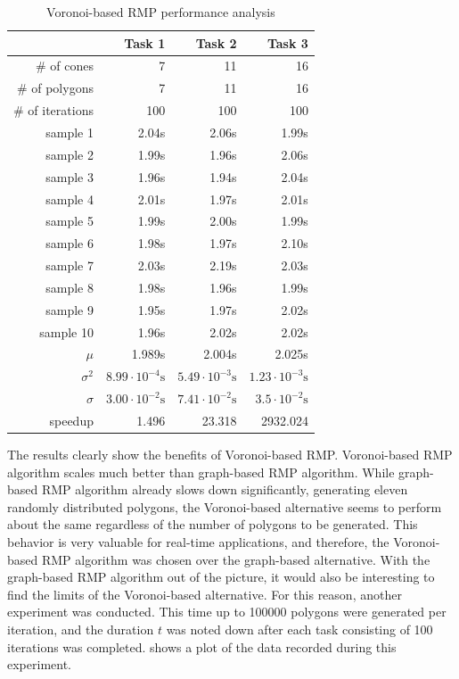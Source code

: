 \documentclass[11pt,a4paper,twoside,openright]{report}
\begin{document}
\begin{table}[h]
\centering
\caption{Voronoi-based RMP performance analysis}
\label{tab:voronoiperformanceanalysis}
\begin{tabular}{|r|r|r|r|}
\hline
 & Task 1 & Task 2 & Task 3 \\ \hline
\# of cones & 7 & 11 & 16 \\ \hline
\# of polygons & 7 & 11 & 16 \\ \hline
\# of iterations & 100 & 100 & 100 \\ \hline
sample 1 & 2.04s & 2.06s & 1.99s \\ \hline
sample 2 & 1.99s & 1.96s & 2.06s \\ \hline
sample 3 & 1.96s & 1.94s & 2.04s \\ \hline
sample 4 & 2.01s & 1.97s & 2.01s \\ \hline
sample 5 & 1.99s & 2.00s & 1.99s \\ \hline
sample 6 & 1.98s & 1.97s & 2.10s \\ \hline
sample 7 & 2.03s & 2.19s & 2.03s \\ \hline
sample 8 & 1.98s & 1.96s & 1.99s \\ \hline
sample 9 & 1.95s & 1.97s & 2.02s \\ \hline
sample 10 & 1.96s & 2.02s & 2.02s \\ \hline
$\mu$ & 1.989s & 2.004s & 2.025s \\ \hline
$\sigma^2$ & $8.99 \cdot 10^{-4}\textrm{s}$ & $5.49 \cdot 10^{-3}\textrm{s} $ & $1.23 \cdot 10^{-3}\textrm{s}$ \\ \hline
$\sigma$ & $3.00 \cdot 10^{-2}\textrm{s}$ & $7.41 \cdot 10^{-2}\textrm{s}$ & $3.5 \cdot 10^{-2}\textrm{s}$ \\ \hline
speedup & 1.496 & 23.318 & 2932.024 \\ \hline
\end{tabular}
\end{table}
The results clearly show the benefits of Voronoi-based RMP. Voronoi-based RMP algorithm scales much better than graph-based RMP algorithm. While graph-based RMP algorithm already slows down significantly, generating eleven randomly distributed polygons, the Voronoi-based alternative seems to perform about the same regardless of the number of polygons to be generated. This behavior is very valuable for real-time applications, and therefore, the Voronoi-based RMP algorithm was chosen over the graph-based alternative. With the graph-based RMP algorithm out of the picture, it would also be interesting to find the limits of the Voronoi-based alternative. For this reason, another experiment was conducted. This time up to 100000 polygons were generated per iteration, and the duration $t$ was noted down after each task consisting of 100 iterations was completed.  shows a plot of the data recorded during this experiment.
\end{document}
